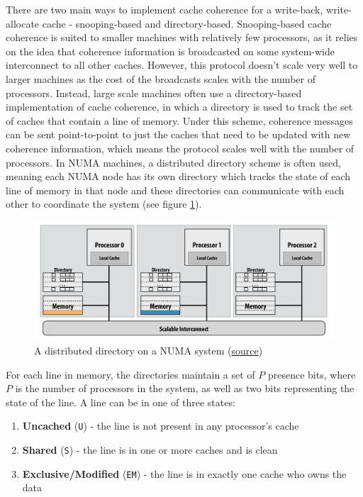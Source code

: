 \documentclass{article}
\begin{document}
There are two main ways to implement cache coherence for a write-back, write-allocate cache - snooping-based and directory-based.  Snooping-based cache coherence is suited to smaller machines with relatively few processors, as it relies on the idea that coherence information is broadcasted on some system-wide interconnect to all other caches. However, this protocol doesn't scale very well to larger machines as the cost of the broadcasts scales with the number of processors.  Instead, large scale machines often use a directory-based implementation of cache coherence, in which a directory is used to track the set of caches that contain a line of memory. Under this scheme, coherence messages can be sent point-to-point to just the caches that need to be updated with new coherence information, which means the protocol scales well with the number of processors.  In NUMA machines, a distributed directory scheme is often used, meaning each NUMA node has its own directory which tracks the state of each line of memory in that node and these directories can communicate with each other to coordinate the system (see figure \ref{fig:numa}).

\begin{figure}[h]
\centering
\includegraphics[width=\textwidth]{figures/numa.png}
\caption{A distributed directory on a NUMA system (\href{http://www.cs.cmu.edu/afs/cs/academic/class/15418-f20/public/lectures/11\_directorycoherence.pdf}{source})}
\label{fig:numa}
\end{figure}

For each line in memory, the directories maintain a set of $P$ presence bits, where $P$ is the number of processors in the system, as well as two bits representing the state of the line. A line can be in one of three states:
\begin{enumerate}
    \item \textbf{Uncached} (\texttt{U}) - the line is not present in any processor's cache
    \item \textbf{Shared} (\texttt{S}) - the line is in one or more caches and is clean
    \item \textbf{Exclusive/Modified} (\texttt{EM}) - the line is in exactly one cache who owns the data
\end{enumerate}
\end{document}
